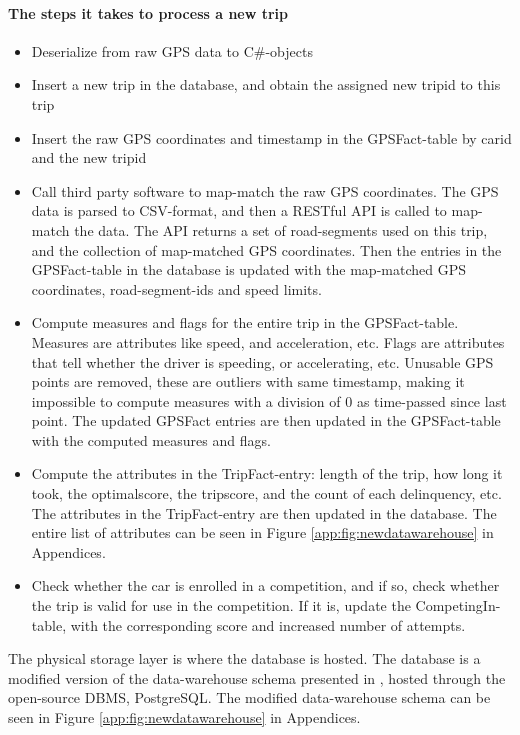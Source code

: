 \paragraph{The steps it takes to process a new trip}
\begin{itemize}
\item Deserialize from raw GPS data to C\#-objects
\item Insert a new trip in the database, and obtain the assigned new tripid to this trip
\item Insert the raw GPS coordinates and timestamp in the GPSFact-table by carid and the new tripid
\item Call third party software to map-match the raw GPS coordinates\cite{trackmatch}. The GPS data is parsed to CSV-format, and then a RESTful API is called to map-match the data. The API returns a set of road-segments used on this trip, and the collection of map-matched GPS coordinates. Then the entries in the GPSFact-table in the database is updated with the map-matched GPS coordinates, road-segment-ids and speed limits.
\item Compute measures and flags for the entire trip in the GPSFact-table. Measures are attributes like speed, and acceleration, etc. Flags are attributes that tell whether the driver is speeding, or accelerating, etc. Unusable GPS points are removed, these are outliers with same timestamp, making it impossible to compute measures with a division of 0 as time-passed since last point. The updated GPSFact entries are then updated in the GPSFact-table with the computed measures and flags.
\item Compute the attributes in the TripFact-entry: length of the trip, how long it took, the optimalscore, the tripscore, and the count of each delinquency, etc. The attributes in the TripFact-entry are then updated in the database. The entire list of attributes can be seen in Figure \ref{app:fig:newdatawarehouse} in Appendices.
\item Check whether the car is enrolled in a competition, and if so, check whether the trip is valid for use in the competition. If it is, update the CompetingIn-table, with the corresponding score and increased number of attempts. 
\end{itemize}

The physical storage layer is where the database is hosted. The database is a modified version of the data-warehouse schema presented in \cite{sw9_report}, hosted through the open-source DBMS, PostgreSQL\cite{postgresql}. The modified data-warehouse schema can be seen in Figure \ref{app:fig:newdatawarehouse} in Appendices.